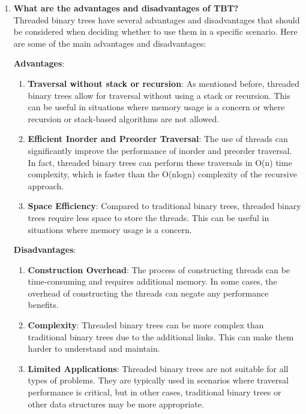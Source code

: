 \documentclass[11pt]{article}
\begin{document}
\begin{enumerate}
    \item \textbf{What are the advantages and disadvantages of TBT?}\\

          Threaded binary trees have several advantages and disadvantages that should be considered when deciding whether to use them in a specific scenario. Here are some of the main advantages and disadvantages:

          \textbf{Advantages}:

          \begin{enumerate}
              \item \textbf{Traversal without stack or recursion}: As mentioned before, threaded binary trees allow for traversal without using a stack or recursion. This can be useful in situations where memory usage is a concern or where recursion or stack-based algorithms are not allowed.

              \item \textbf{Efficient Inorder and Preorder Traversal}: The use of threads can significantly improve the performance of inorder and preorder traversal. In fact, threaded binary trees can perform these traversals in O(n) time complexity, which is faster than the O(nlogn) complexity of the recursive approach.

              \item \textbf{Space Efficiency}: Compared to traditional binary trees, threaded binary trees require less space to store the threads. This can be useful in situations where memory usage is a concern.

          \end{enumerate}
          \textbf{Disadvantages}:
          \begin{enumerate}


              \item \textbf{Construction Overhead}: The process of constructing threads can be time-consuming and requires additional memory. In some cases, the overhead of constructing the threads can negate any performance benefits.

              \item \textbf{Complexity}: Threaded binary trees can be more complex than traditional binary trees due to the additional links. This can make them harder to understand and maintain.

              \item \textbf{Limited Applications}: Threaded binary trees are not suitable for all types of problems. They are typically used in scenarios where traversal performance is critical, but in other cases, traditional binary trees or other data structures may be more appropriate.
          \end{enumerate}


\end{enumerate}
\end{document}
